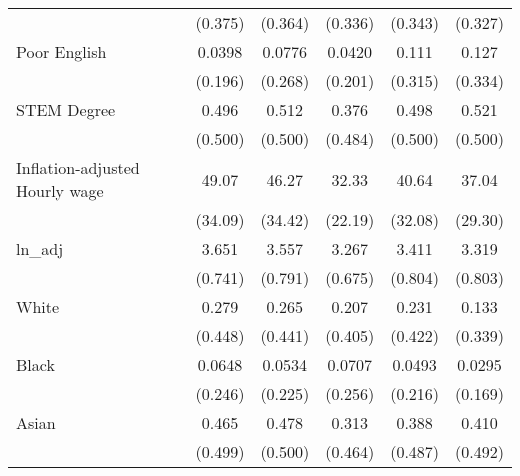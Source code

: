 \begin{table}[htbp]
\begin{tabular}{l*{5}{c}}
                    &     (0.375)         &     (0.364)         &     (0.336)         &     (0.343)         &     (0.327)         \\
[1em]
Poor English        &      0.0398         &      0.0776         &      0.0420         &       0.111         &       0.127         \\
                    &     (0.196)         &     (0.268)         &     (0.201)         &     (0.315)         &     (0.334)         \\
[1em]
STEM Degree         &       0.496         &       0.512         &       0.376         &       0.498         &       0.521         \\
                    &     (0.500)         &     (0.500)         &     (0.484)         &     (0.500)         &     (0.500)         \\
[1em]
Inflation-adjusted Hourly wage&       49.07         &       46.27         &       32.33         &       40.64         &       37.04         \\
                    &     (34.09)         &     (34.42)         &     (22.19)         &     (32.08)         &     (29.30)         \\
[1em]
ln\_adj              &       3.651         &       3.557         &       3.267         &       3.411         &       3.319         \\
                    &     (0.741)         &     (0.791)         &     (0.675)         &     (0.804)         &     (0.803)         \\
[1em]
White               &       0.279         &       0.265         &       0.207         &       0.231         &       0.133         \\
                    &     (0.448)         &     (0.441)         &     (0.405)         &     (0.422)         &     (0.339)         \\
[1em]
Black               &      0.0648         &      0.0534         &      0.0707         &      0.0493         &      0.0295         \\
                    &     (0.246)         &     (0.225)         &     (0.256)         &     (0.216)         &     (0.169)         \\
[1em]
Asian               &       0.465         &       0.478         &       0.313         &       0.388         &       0.410         \\
                    &     (0.499)         &     (0.500)         &     (0.464)         &     (0.487)         &     (0.492)         \\

\end{tabular}
\end{table}
